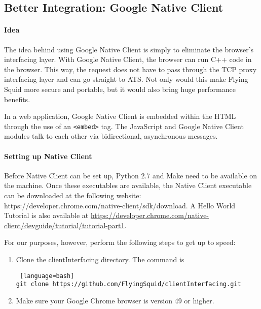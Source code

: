 \begin{appendices}



\section{Better Integration: Google Native Client }

\paragraph{Idea}

The idea behind using Google Native Client \cite{GoogleNativeClient} is simply to eliminate the browser's interfacing layer. With Google Native Client, the browser can run C++ code in the browser. This way, the request does not have to pass through the TCP proxy interfacing layer and can go straight to ATS. Not only would this make Flying Squid more secure and portable, but it would also bring huge performance benefits.

In a web application, Google Native Client is embedded within the HTML through the use of an \verb|<embed>| tag. The JavaScript and Google Native Client modules talk to each other via bidirectional, asynchronous messages.

\paragraph{Setting up Native Client}

Before Native Client can be set up, Python 2.7 and Make need to be available on the machine. Once these executables are available, the Native Client executable can be downloaded at the following website: https://developer.chrome.com/native-client/sdk/download. A Hello World Tutorial is also available at \url{https://developer.chrome.com/native-client/devguide/tutorial/tutorial-part1}.

For our purposes, however, perform the following steps to get up to speed:

\begin{enumerate} 
\item Clone the clientInterfacing directory. The command is 

\begin{lstlisting} [language=bash] 
git clone https://github.com/FlyingSquid/clientInterfacing.git
\end{lstlisting}

\item  Make sure your Google Chrome browser is version 49 or higher.


\end{enumerate}
\end{appendices}
